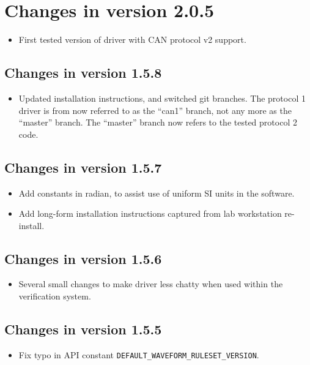 \documentclass[fontsize=12,a4paper]{scrreprt}
\begin{document}
\section*{Changes in version 2.0.5}
\begin{itemize}
\item First tested version of driver with CAN protocol v2 support.
\end{itemize}

\subsection*{Changes in version 1.5.8}
\begin{itemize}
\item Updated installation instructions, and switched git
  branches. The protocol 1 driver is from now referred to as the
  ``can1'' branch, not any more as the ``master'' branch. The
  ``master'' branch now refers to the tested protocol 2 code.
\end{itemize}

\subsection*{Changes in version 1.5.7}
\begin{itemize}
\item Add constants in radian, to assist use of uniform SI units in
  the software.
\item Add long-form installation instructions captured from lab
  workstation re-install.
\end{itemize}


\subsection*{Changes in version 1.5.6}
\begin{itemize}
\item Several small changes to make driver less chatty when
  used within the verification system.
\end{itemize}


\subsection*{Changes in version 1.5.5}
\begin{itemize}
\item Fix typo in API constant \texttt{DEFAULT\_WAVEFORM\_RULESET\_VERSION}.
\end{itemize}
\end{document}
